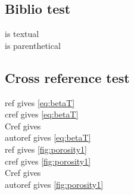 \subsection*{Biblio test}
\citet{carozzani_direct_2013} is textual \\
\citep{carozzani_direct_2013} is parenthetical \\
\subsection*{Cross reference test}
ref gives \ref{eq:betaT} \\
cref gives \cref{eq:betaT} \\
Cref gives  \\
autoref gives \autoref{eq:betaT} \\


ref gives \ref{fig:porosity1} \\
cref gives \cref{fig:porosity1} \\
Cref gives  \\
autoref gives \autoref{fig:porosity1} \\


